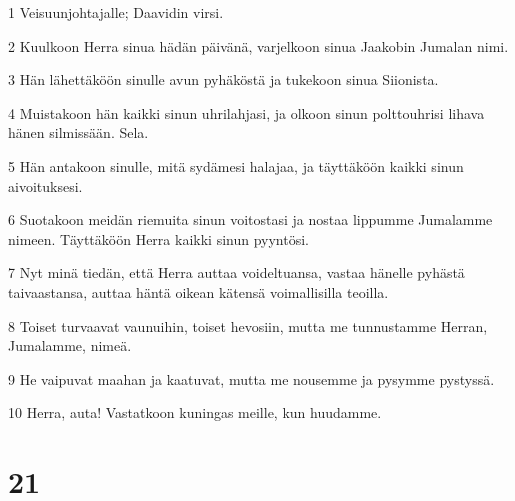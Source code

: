 \par 1 Veisuunjohtajalle; Daavidin virsi.
\par 2 Kuulkoon Herra sinua hädän päivänä, varjelkoon sinua Jaakobin Jumalan nimi.
\par 3 Hän lähettäköön sinulle avun pyhäköstä ja tukekoon sinua Siionista.
\par 4 Muistakoon hän kaikki sinun uhrilahjasi, ja olkoon sinun polttouhrisi lihava hänen silmissään. Sela.
\par 5 Hän antakoon sinulle, mitä sydämesi halajaa, ja täyttäköön kaikki sinun aivoituksesi.
\par 6 Suotakoon meidän riemuita sinun voitostasi ja nostaa lippumme Jumalamme nimeen. Täyttäköön Herra kaikki sinun pyyntösi.
\par 7 Nyt minä tiedän, että Herra auttaa voideltuansa, vastaa hänelle pyhästä taivaastansa, auttaa häntä oikean kätensä voimallisilla teoilla.
\par 8 Toiset turvaavat vaunuihin, toiset hevosiin, mutta me tunnustamme Herran, Jumalamme, nimeä.
\par 9 He vaipuvat maahan ja kaatuvat, mutta me nousemme ja pysymme pystyssä.
\par 10 Herra, auta! Vastatkoon kuningas meille, kun huudamme.

\chapter{21}


